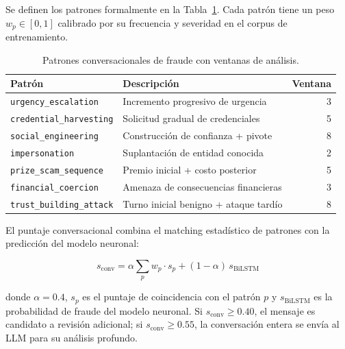 \documentclass{llncs}
\begin{document}
Se definen los patrones formalmente en la Tabla~\ref{tab:patterns}.
Cada patrón tiene un peso $w_p \in [0,1]$ calibrado por su
frecuencia y severidad en el corpus de entrenamiento.

\begin{table}[t]
\caption{Patrones conversacionales de fraude con ventanas de análisis.}
\label{tab:patterns}
\centering
\begin{tabular}{llr}
\toprule
Patrón & Descripción & Ventana \\
\midrule
\texttt{urgency\_escalation}    & Incremento progresivo de urgencia & 3 \\
\texttt{credential\_harvesting} & Solicitud gradual de credenciales & 5 \\
\texttt{social\_engineering}    & Construcción de confianza + pivote & 8 \\
\texttt{impersonation}          & Suplantación de entidad conocida  & 2 \\
\texttt{prize\_scam\_sequence}  & Premio inicial + costo posterior  & 5 \\
\texttt{financial\_coercion}    & Amenaza de consecuencias financieras & 3 \\
\texttt{trust\_building\_attack}& Turno inicial benigno + ataque tardío & 8 \\
\bottomrule
\end{tabular}
\end{table}

El puntaje conversacional combina el matching estadístico de
patrones con la predicción del modelo neuronal:

\begin{equation}
  s_{\mathrm{conv}} = \alpha \sum_{p} w_p \cdot s_p
    + (1-\alpha)\, s_{\mathrm{BiLSTM}}
  \label{eq:conv}
\end{equation}

donde $\alpha=0.4$, $s_p$ es el puntaje de coincidencia con el
patrón $p$ y $s_{\mathrm{BiLSTM}}$ es la probabilidad de fraude
del modelo neuronal.
Si $s_{\mathrm{conv}} \geq 0.40$, el mensaje es candidato a
revisión adicional; si $s_{\mathrm{conv}} \geq 0.55$, la conversación
entera se envía al LLM para su análisis profundo.
\end{document}
